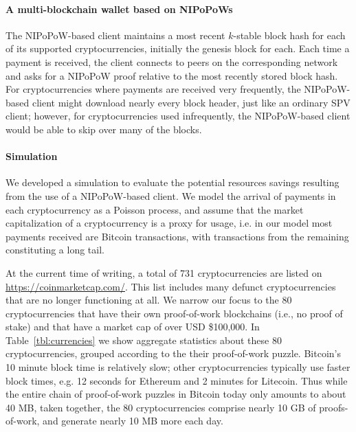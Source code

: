 \paragraph{A multi-blockchain wallet based on NIPoPoWs}
 The NIPoPoW-based client maintains a most recent $k$-stable block hash for each of its supported cryptocurrencies, initially the genesis block for each.
  Each time a payment is received, the client connects to peers on the corresponding network and asks for a NIPoPoW proof relative to the most recently stored block hash. For cryptocurrencies where payments are received very frequently, the NIPoPoW-based client might download nearly every block header, just like an ordinary SPV client; however, for cryptocurrencies used infrequently, the NIPoPoW-based client would be able to skip over many of the blocks.

\paragraph{Simulation}
 We developed a simulation to evaluate the potential resources savings resulting from the use of a NIPoPoW-based client.
 We model the arrival of payments in each cryptocurrency as a Poisson process, and assume that the market capitalization of a cryptocurrency is a proxy for usage, i.e. in our model most payments received are Bitcoin transactions, with transactions from the remaining constituting a long tail.

 At the current time of writing, a total of 731 cryptocurrencies are listed on \url{https://coinmarketcap.com/}.
This list includes many defunct cryptocurrencies that are no longer functioning at all.
We narrow our focus to the 80 cryptocurrencies that have their own proof-of-work blockchains
 (i.e., no proof of stake) and that have a market cap of over USD \$100,000.
In Table~\ref{tbl:currencies} we show aggregate statistics about these 80 cryptocurrencies, grouped according to the their proof-of-work puzzle.
Bitcoin's 10 minute block time is relatively slow; other cryptocurrencies typically use faster block times, e.g. 12 seconds for Ethereum and 2 minutes for Litecoin. Thus while the entire chain of proof-of-work puzzles in Bitcoin today only amounts to about 40 MB, taken together, the 80 cryptocurrencies comprise nearly 10 GB of proofs-of-work, and generate nearly 10 MB more each day.

